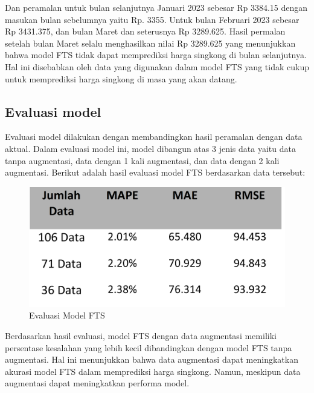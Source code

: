 \documentclass[conference]{IEEEtran}
\begin{document}
Dan peramalan untuk bulan selanjutnya Januari 2023 sebesar Rp 3384.15 dengan masukan bulan sebelumnya yaitu Rp. 3355. Untuk bulan Februari 2023 sebesar Rp 3431.375, dan bulan Maret dan seterusnya Rp 3289.625. Hasil permalan setelah bulan Maret selalu menghasilkan nilai Rp 3289.625 yang menunjukkan bahwa model FTS tidak dapat memprediksi harga singkong di bulan selanjutnya. Hal ini disebabkan oleh data yang digunakan dalam model FTS yang tidak cukup untuk memprediksi harga singkong di masa yang akan datang.


\subsection{Evaluasi model}
Evaluasi model dilakukan dengan membandingkan hasil peramalan dengan data aktual. Dalam evaluasi model ini, model dibangun atas 3 jenis data yaitu data tanpa augmentasi, data dengan 1 kali augmentasi, dan data dengan 2 kali augmentasi. Berikut adalah hasil evaluasi model FTS berdasarkan data tersebut:
\begin{figure}[H]
    \centering
    \includegraphics[width=\columnwidth]{images/table_evaluasi.png} 
    \caption{Evaluasi Model FTS}
\end{figure}

Berdasarkan hasil evaluasi, model FTS dengan data augmentasi memiliki persentase kesalahan yang lebih kecil dibandingkan dengan model FTS tanpa augmentasi. Hal ini menunjukkan bahwa data augmentasi dapat meningkatkan akurasi model FTS dalam memprediksi harga singkong. Namun, meskipun data augmentasi dapat meningkatkan performa model. 
\end{document}
